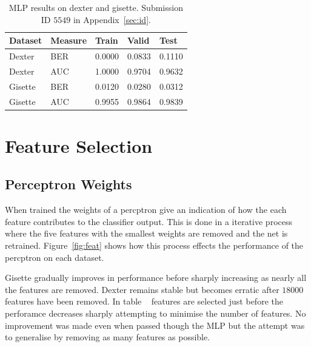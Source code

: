 \documentclass{ecsarticle}     %
\begin{document}
\begin{table}[h]
	\centering
	\begin{tabular}{|l|l|l|l|l|} \hline
     	\textbf{Dataset}	& \textbf{Measure}	& \textbf{Train} & \textbf{Valid} & \textbf{Test} \\ \hline
		Dexter & BER & 0.0000 & 0.0833 & 0.1110 \\ \hline
		Dexter & AUC & 1.0000 & 0.9704 & 0.9632 \\ \hline
		Gisette & BER & 0.0120 & 0.0280 & 0.0312 \\ \hline
		Gisette & AUC & 0.9955 & 0.9864 & 0.9839 \\ \hline
	\end{tabular}
	\caption{MLP results on dexter and gisette. Submission ID $5549$ in Appendix~\ref{sec:id}.}
	\label{tab:mlp_test}
\end{table}







\section{Feature Selection}

\subsection{Perceptron Weights}

When trained the weights of a percptron give an indication of how the each feature contributes to the classifier output.
This is done in a iterative process where the five features with the smallest weights are removed and the net is retrained.
Figure~\ref{fig:feat} shows how this process effects the performance of the percptron on each dataset.

Gisette gradually improves in performance before sharply increasing as nearly all the features are removed.
Dexter remains stable but becomes erratic after $18000$ features have been removed.
In table ~\cite{tab:feat_test} features are selected just before the perforamce decreases sharply attempting to minimise the number of features.
No improvement was made even when passed though the MLP but the attempt was to generalise by removing as many features as possible. 
\end{document}

